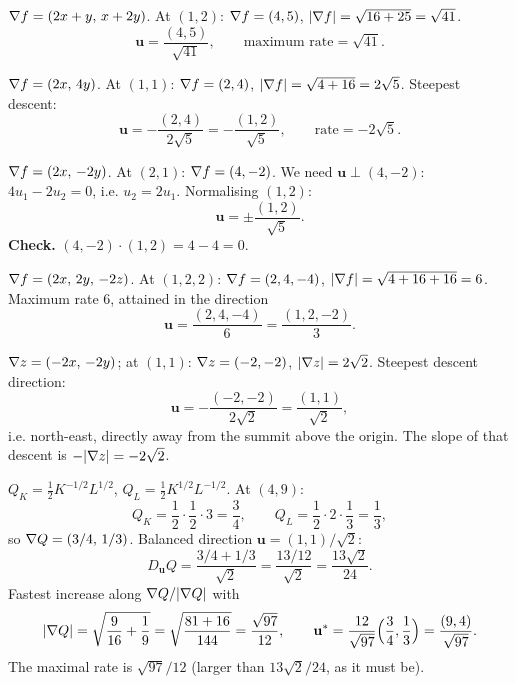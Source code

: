 \begin{solutions}
  \item $\nabla f=(2x+y,\,x+2y)$. At $(1,2)$: $\nabla f=(4,5)$,
        $|\nabla f|=\sqrt{16+25}=\sqrt{41}$.
        \[
          \mathbf{u}=\frac{(4,5)}{\sqrt{41}},\qquad
          \text{maximum rate}=\sqrt{41} .
        \]

  \item $\nabla f=(2x,\,4y)$. At $(1,1)$: $\nabla f=(2,4)$,
        $|\nabla f|=\sqrt{4+16}=2\sqrt{5}$. Steepest descent:
        \[
          \mathbf{u}=-\frac{(2,4)}{2\sqrt{5}}=-\frac{(1,2)}{\sqrt{5}},
          \qquad \text{rate}=-2\sqrt{5} .
        \]

  \item $\nabla f=(2x,\,-2y)$. At $(2,1)$: $\nabla f=(4,-2)$. We need
        $\mathbf{u}\perp(4,-2)$: $4u_{1}-2u_{2}=0$, i.e.
        $u_{2}=2u_{1}$. Normalising $(1,2)$:
        \[
          \mathbf{u}=\pm\frac{(1,2)}{\sqrt{5}} .
        \]
        \textbf{Check.} $(4,-2)\cdot(1,2)=4-4=0$. \checkmark

  \item $\nabla f=(2x,\,2y,\,-2z)$. At $(1,2,2)$: $\nabla f=(2,4,-4)$,
        $|\nabla f|=\sqrt{4+16+16}=6$. Maximum rate $6$, attained in the
        direction
        \[
          \mathbf{u}=\frac{(2,4,-4)}{6}=\frac{(1,2,-2)}{3} .
        \]

  \item $\nabla z=(-2x,\,-2y)$; at $(1,1)$: $\nabla z=(-2,-2)$,
        $|\nabla z|=2\sqrt{2}$. Steepest descent direction:
        \[
          \mathbf{u}=-\frac{(-2,-2)}{2\sqrt{2}}=\frac{(1,1)}{\sqrt{2}} ,
        \]
        i.e. north-east, directly away from the summit above the origin.
        The slope of that descent is $-|\nabla z|=-2\sqrt{2}$.

  \item $Q_{K}=\tfrac12K^{-1/2}L^{1/2}$, $Q_{L}=\tfrac12K^{1/2}L^{-1/2}$.
        At $(4,9)$:
        \[
          Q_{K}=\frac{1}{2}\cdot\frac{1}{2}\cdot 3=\frac{3}{4},\qquad
          Q_{L}=\frac{1}{2}\cdot 2\cdot\frac{1}{3}=\frac{1}{3},
        \]
        so $\nabla Q=(3/4,\,1/3)$. Balanced direction
        $\mathbf{u}=(1,1)/\sqrt{2}$:
        \[
          D_{\mathbf{u}}Q=\frac{3/4+1/3}{\sqrt{2}}
            =\frac{13/12}{\sqrt{2}}=\frac{13\sqrt{2}}{24} .
        \]
        Fastest increase along $\nabla Q/|\nabla Q|$ with
        \[
          |\nabla Q|=\sqrt{\frac{9}{16}+\frac{1}{9}}
            =\sqrt{\frac{81+16}{144}}=\frac{\sqrt{97}}{12},\qquad
          \mathbf{u}^{*}=\frac{12}{\sqrt{97}}\Bigl(\frac34,\frac13\Bigr)
            =\frac{(9,4)}{\sqrt{97}} .
        \]
        The maximal rate is $\sqrt{97}/12$ (larger than $13\sqrt{2}/24$,
        as it must be).


\end{solutions}
